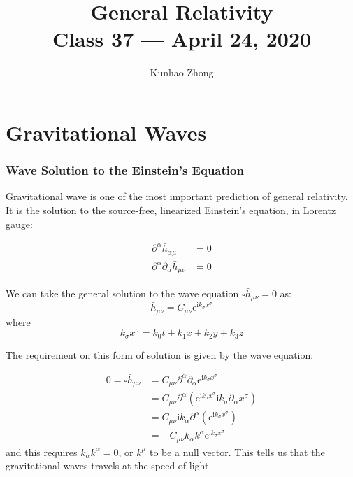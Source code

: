 \documentclass[10pt]{article}
\title{{\Huge General Relativity}\\{\Large{Class 37 --- April 24, 2020}}} %
\author{Kunhao Zhong}
\begin{document}
    \maketitle
    \flushbottom
    \newpage
    \pagestyle{fancynotes}
    \part{Gravitational Waves}

\section{Wave Solution to the Einstein's Equation}

Gravitational wave is one of the most important prediction of general relativity. It is the solution to the source-free, linearized Einstein's equation, in Lorentz gauge:

\begin{equation}\label{eq: wave_eqn}
\begin{aligned}
\partial^{\alpha} \bar{h}_{\alpha \mu}&=0\\
\partial^{\alpha} \partial_{\alpha} \bar{h}_{\mu\nu}&=0
\end{aligned}
\end{equation}

We can take the general solution to the wave equation $ \square \bar{h}_{\mu\nu}=0 $ as:
\begin{equation}\label{eq: wave_form}
\bar{h}_{\mu\nu}=C_{\mu\nu} \mathrm{e}^{\mathrm{i} k_{\sigma}x^{\sigma}}
\end{equation}
where
\begin{equation}\label{eq: kx_component}
k_{\sigma}x^{\sigma}=k_0 t+k_1 x+ k_2 y+k_3 z
\end{equation}

The requirement on this form of solution is given by the wave equation:

\begin{equation}\label{eq: null_condition}
\begin{aligned}
0=\square \bar{h}_{\mu\nu}&=C_{\mu\nu} \partial^{\alpha} \partial _{\alpha} \mathrm{e}^{\mathrm{i}k_\sigma x^\sigma}\\
&=C_{\mu\nu}\partial^\alpha (\mathrm{e}^{\mathrm{i} k_\sigma x^\sigma} \mathrm{i}k_\sigma \partial_\alpha x^\sigma)\\
&=C_{\mu\nu}\mathrm{i}k_\alpha \partial^\alpha (\mathrm{e}^{\mathrm{i}k_\sigma x^\sigma})\\
&=-C_{\mu\nu} k_\alpha k^\alpha \mathrm{e}^{\mathrm{i} k_\sigma x^\sigma}
\end{aligned}
\end{equation}
and this requires $ k_\alpha k^\alpha=0 $, or $ k^\mu $ to be a null vector. This tells us that the gravitational waves travels at the speed of light.
\end{document}
